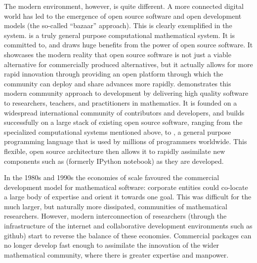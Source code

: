 
The modern environment, however, is quite different. A more connected
digital world has led to the emergence of open source software and
open development models (the so-called ``bazaar'' approach). This is
clearly exemplified in the \Sage system. \Sage is a truly
general purpose computational mathematical system. It is committed to,
and draws huge benefits from the power of open source software.
It showcases the modern
reality that open source software is not just a viable alternative for
commercially produced alternatives, but it actually allows for more
rapid innovation through providing an open platform through which the
community can deploy and share advances more rapidly. \Sage demonstrates
this modern community approach to development by
delivering high quality software to researchers, teachers, and
practitioners in mathematics. It is founded on a widespread
international community of contributors and developers, and builds
successfully on a large stack of existing open source software,
ranging from the specialized computational systems mentioned above, to
\Python, a general purpose programming language that is used by
millions of programmers worldwide. This flexible, open source
architecture then allows it to rapidly assimilate new components such
as \Jupyter (formerly IPython notebook) as they are developed.

In the 1980s and 1990s the economies of scale favoured the commercial
development model for mathematical software: corporate entities could
co-locate a large body of expertise and orient it towards one
goal. This was difficult for the much larger, but naturally more
dissipated, communities of mathematical researchers. However, modern
interconnection of researchers (through the infrastructure of the
internet and collaborative development environments such as github)
start to reverse the balance of these economies. Commercial packages
can no longer develop fast enough to assimilate the innovation of the
wider mathematical community, where there is greater expertise and
manpower.




